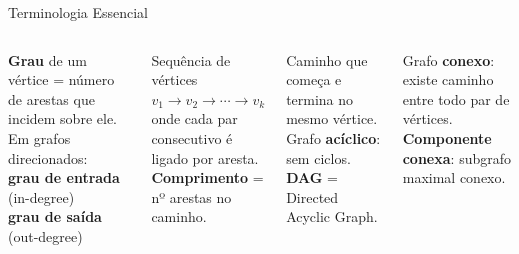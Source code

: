 \documentclass[aspectratio=169,10pt]{beamer}
\begin{document}
\begin{frame}{Terminologia Essencial}
  \begin{columns}[t]
      \begin{tcolorbox}[caixaGrafo,title={Grau}]
        \footnotesize
        \textbf{Grau} de um vértice = número de arestas que incidem sobre ele.\\[4pt]
        Em grafos direcionados:\\
        \textbf{grau de entrada} (in-degree)\\
        \textbf{grau de saída} (out-degree)
      \end{tcolorbox}
      \vspace{0.08cm}
      \begin{tcolorbox}[caixaAzul,title={Caminho}]
        \footnotesize
        Sequência de vértices\\
        $v_1 \to v_2 \to \cdots \to v_k$\\
        onde cada par consecutivo é ligado por aresta.\\[3pt]
        \textbf{Comprimento} = nº arestas no caminho.
      \end{tcolorbox}
      \begin{tcolorbox}[caixaDfs,title={Ciclo}]
        \footnotesize
        Caminho que começa e termina no mesmo vértice.\\[4pt]
        Grafo \textbf{acíclico}: sem ciclos.\\[4pt]
        \textbf{DAG} = Directed Acyclic Graph.
      \end{tcolorbox}
      \vspace{0.08cm}
      \begin{tcolorbox}[caixaVerde,title={Conectividade}]
        \footnotesize
        Grafo \textbf{conexo}: existe caminho entre todo par de vértices.\\[4pt]
        \textbf{Componente conexa}: subgrafo maximal conexo.
      \end{tcolorbox}
      \centering
  \end{columns}
\end{frame}
\end{document}
